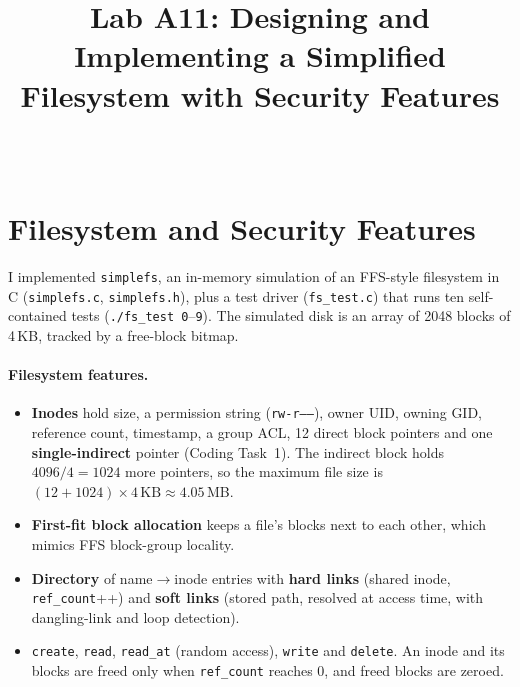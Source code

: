 \documentclass[11pt]{article}
\title{\textbf{Lab A11: Designing and Implementing a Simplified\\
       Filesystem with Security Features}}
\author{\studentname \\ \course}
\date{\labdate}
\begin{document}
\maketitle

\section{Filesystem and Security Features}
I implemented \texttt{simplefs}, an in-memory simulation of an FFS-style
filesystem in C (\texttt{simplefs.c}, \texttt{simplefs.h}), plus a test
driver (\texttt{fs\_test.c}) that runs ten self-contained tests
(\texttt{./fs\_test 0}--\texttt{9}). The simulated disk is an array of
2048 blocks of 4\,KB, tracked by a free-block bitmap.

\paragraph{Filesystem features.}
\begin{itemize}
  \item \textbf{Inodes} hold size, a permission string (\texttt{rw-r-----}),
        owner UID, owning GID, reference count, timestamp, a group ACL,
        12 direct block pointers and one \textbf{single-indirect} pointer
        (Coding Task~1). The indirect block holds $4096/4 = 1024$ more
        pointers, so the maximum file size is $(12+1024)\times4\,\text{KB}
        \approx 4.05$\,MB.
  \item \textbf{First-fit block allocation} keeps a file's blocks next to
        each other, which mimics FFS block-group locality.
  \item \textbf{Directory} of name$\rightarrow$inode entries with
        \textbf{hard links} (shared inode, \texttt{ref\_count}++) and
        \textbf{soft links} (stored path, resolved at access time, with
        dangling-link and loop detection).
  \item \texttt{create}, \texttt{read}, \texttt{read\_at} (random access),
        \texttt{write} and \texttt{delete}. An inode and its blocks are
        freed only when \texttt{ref\_count} reaches 0, and freed blocks are
        zeroed.
\end{itemize}
\end{document}

